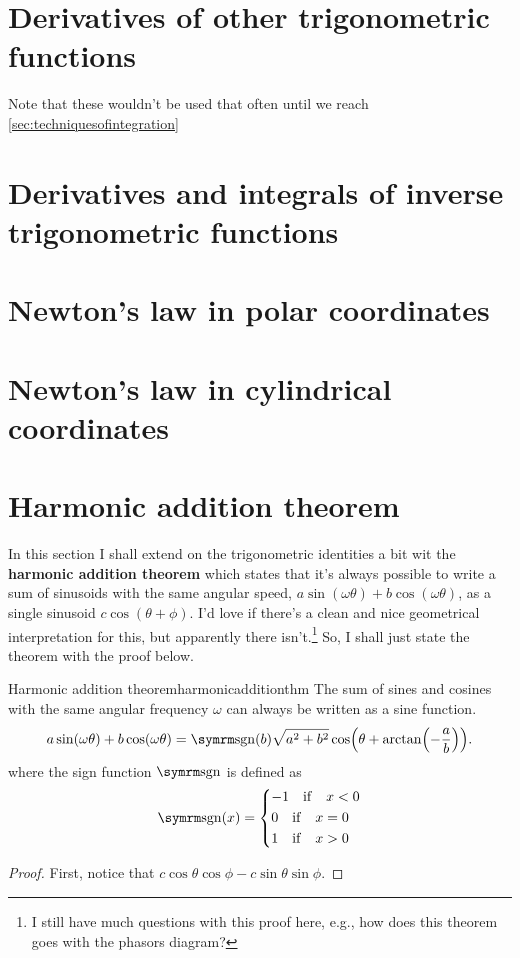 \section{Derivatives of other trigonometric functions}

Note that these wouldn't be used that often until we reach \cref{sec:techniquesofintegration}

\section{Derivatives and integrals of inverse trigonometric functions}

\section{Newton's law in polar coordinates}

\section{Newton's law in cylindrical coordinates}

\section{Harmonic addition theorem}

In this section I shall extend on the trigonometric identities a bit wit the \textbf{harmonic addition theorem} which states that it's always possible to write a sum of sinusoids with the same angular speed, $a\sin(\omega\theta) + b\cos(\omega\theta)$, as a single sinusoid $c\cos(\theta + \phi)$. I'd love if there's a clean and nice geometrical interpretation for this, but apparently there isn't.\footnote{I still have much questions with this proof here, e.g., how does this theorem goes with the phasors diagram?} So, I shall just state the theorem with the proof below.
\begin{thm}{Harmonic addition theorem}{harmonicadditionthm}
    The sum of sines and cosines with the same angular frequency $\omega$ can always be written as a sine function.
    \begin{equation*}
        a\sin(\omega \theta) + b\cos(\omega \theta) = \sgn(b)\sqrt{a^2 + b^2}\cos(\theta + \arctan(-\frac{a}{b})).
    \end{equation*}
    where the sign function $\sgn$ is defined as
    \begin{equation*}
        \sgn(x) = 
        \begin{cases*}
            -1 \quad \mathrm{if} \quad x < 0 \\
            0 \quad \mathrm{if} \quad x = 0 \\
            1 \quad \mathrm{if} \quad x > 0
        \end{cases*}
    \end{equation*}
\end{thm}

\begin{proof}
    First, notice that
    $c\cos\theta\cos\phi - c\sin\theta\sin\phi$.
\end{proof}
